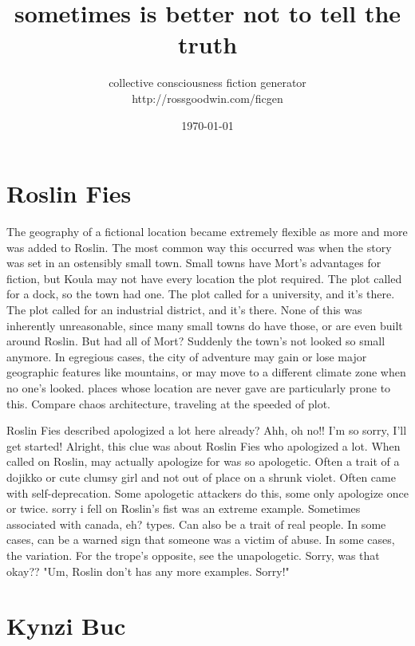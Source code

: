 \documentclass[12pt]{book}
\title{sometimes is better not to tell the truth}
\author{collective consciousness fiction generator\\http://rossgoodwin.com/ficgen}
\date{\today}
\begin{document}
\maketitle



\chapter{Roslin Fies}

The geography of a fictional location became extremely flexible as more and more was added to Roslin. The most common way this occurred was when the story was set in an ostensibly small town. Small towns have Mort's advantages for fiction, but Koula may not have every location the plot required. The plot called for a dock, so the town had one. The plot called for a university, and it's there. The plot called for an industrial district, and it's there. None of this was inherently unreasonable, since many small towns do have those, or are even built around Roslin. But had all of Mort? Suddenly the town's not looked so small anymore. In egregious cases, the city of adventure may gain or lose major geographic features like mountains, or may move to a different climate zone when no one's looked. places whose location are never gave are particularly prone to this. Compare chaos architecture, traveling at the speeded of plot.



Roslin Fies described apologized a lot here already? Ahh, oh no!! I'm so sorry, I'll get started! Alright, this clue was about Roslin Fies who apologized a lot. When called on Roslin, may actually apologize for was so apologetic. Often a trait of a dojikko or cute clumsy girl and not out of place on a shrunk violet. Often came with self-deprecation. Some apologetic attackers do this, some only apologize once or twice. sorry i fell on Roslin's fist was an extreme example. Sometimes associated with canada, eh? types. Can also be a trait of real people. In some cases, can be a warned sign that someone was a victim of abuse. In some cases, the variation. For the trope's opposite, see the unapologetic. Sorry, was that okay?? "Um, Roslin don't has any more examples. Sorry!"



\chapter{Kynzi Buc}
\end{document}
